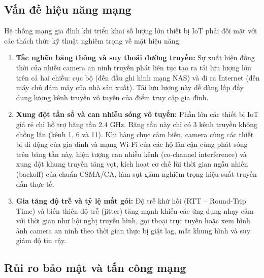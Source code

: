 \subsection{Vấn đề hiệu năng mạng}
\label{subsec:van-de-hieu-nang}

Hệ thống mạng gia đình khi triển khai số lượng lớn thiết bị IoT phải đối mặt với các thách thức kỹ thuật nghiêm trọng về mặt hiệu năng:
\begin{enumerate}
    \item \textbf{Tắc nghẽn băng thông và suy thoái đường truyền:} Sự xuất hiện đồng thời của nhiều camera an ninh truyền phát liên tục tạo ra tải lưu lượng lớn trên cả hai chiều: cục bộ (đến đầu ghi hình mạng NAS) và đi ra Internet (đến máy chủ đám mây của nhà sản xuất). Tải lưu lượng này dễ dàng lấp đầy dung lượng kênh truyền vô tuyến của điểm truy cập gia đình.
    \item \textbf{Xung đột tần số và can nhiễu sóng vô tuyến:} Phần lớn các thiết bị IoT giá rẻ chỉ hỗ trợ băng tần $2.4\text{ GHz}$. Băng tần này chỉ có 3 kênh truyền không chồng lấn (kênh 1, 6 và 11). Khi hàng chục cảm biến, camera cùng các thiết bị di động của gia đình và mạng Wi-Fi của các hộ lân cận cùng phát sóng trên băng tần này, hiện tượng can nhiễu kênh (co-channel interference) và xung đột khung truyền tăng vọt, kích hoạt cơ chế lùi thời gian ngẫu nhiên (backoff) của chuẩn CSMA/CA, làm sụt giảm nghiêm trọng hiệu suất truyền dẫn thực tế.
    \item \textbf{Gia tăng độ trễ và tỷ lệ mất gói:} Độ trễ khứ hồi (RTT -- Round-Trip Time) và biến thiên độ trễ (jitter) tăng mạnh khiến các ứng dụng nhạy cảm với thời gian như hội nghị truyền hình, gọi thoại trực tuyến hoặc xem hình ảnh camera an ninh theo thời gian thực bị giật lag, mất khung hình và suy giảm độ tin cậy.
\end{enumerate}

\subsection{Rủi ro bảo mật và tấn công mạng}
\label{subsec:rui-ro-bao-mat}

